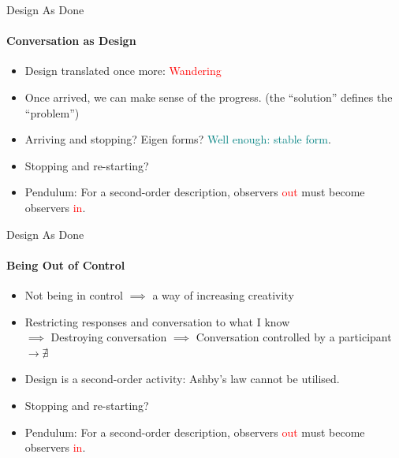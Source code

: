 \documentclass[
	11pt,
	aspectratio=169,
]{beamer}
\begin{document}
            \begin{frame}{Design As Done}
            \framesubtitle{Conversation as Design}
    		    \begin{itemize}
    		        \item<1-> Design translated once more: \textcolor{red}{Wandering}
                    \item<2-> Once arrived, we can make sense of the progress. (the ``solution'' defines the ``problem'')
                    \item<3-> Arriving and stopping? Eigen forms? \textcolor{teal}{Well enough: stable form}.
                    \item<4-> Stopping and re-starting? 
                    \item<5-> Pendulum: For a second-order description, observers \textcolor{red}{out} must become observers \textcolor{red}{in}.
    		    \end{itemize}
            \end{frame}
            \begin{frame}{Design As Done}
            \framesubtitle{Being Out of Control}
    		    \begin{itemize}
    		        \item<1-> Not being in control $\implies$ a way of increasing creativity
                    \item<2-> Restricting responses and conversation to what I know\\
                        $\implies$ Destroying conversation
                        $\implies$ Conversation controlled by a participant $\longrightarrow \nexists$
                    \item<3-> Design is a second-order activity: Ashby's law cannot be utilised.
                    \item<4-> Stopping and re-starting? 
                    \item<5-> Pendulum: For a second-order description, observers \textcolor{red}{out} must become observers \textcolor{red}{in}.
    		    \end{itemize}
            \end{frame}
\end{document}
